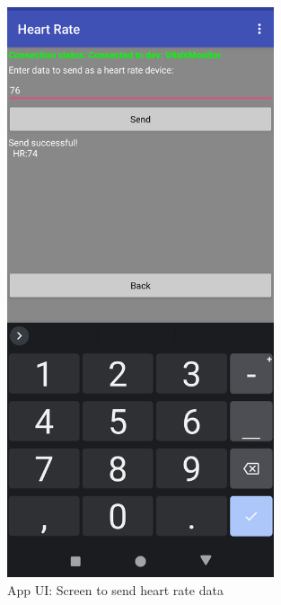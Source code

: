 \newpage
\begin{figure}[H]
	\centering
	\includegraphics[width=0.7\textwidth]{images/app_ui_send_hr}
	\caption{App UI: Screen to send heart rate data}
	\label{appendix:app_ui_hr}
\end{figure}

